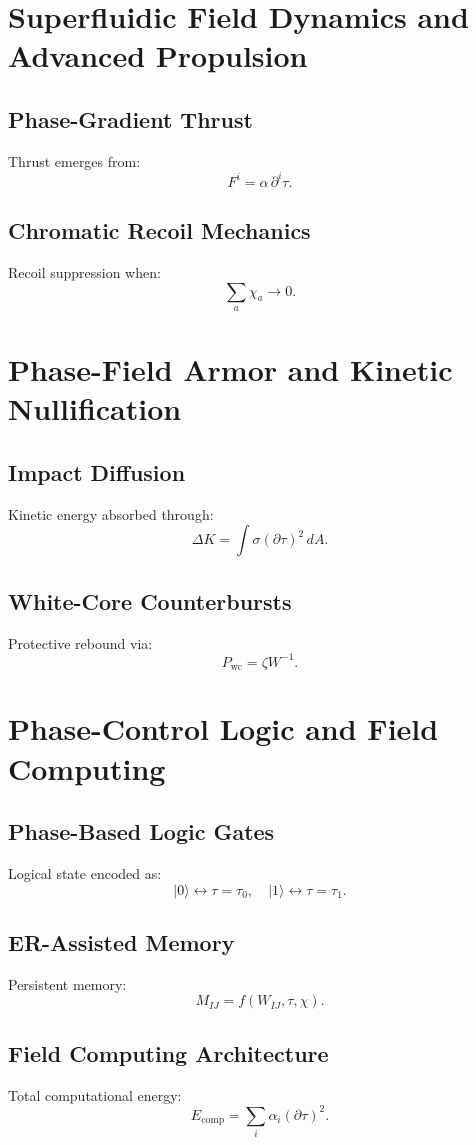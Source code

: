 \chapter{Superfluidic Field Dynamics and Advanced Propulsion}

\section{Phase-Gradient Thrust}
Thrust emerges from:
\[
F^i = \alpha\, \partial^i \tau.
\]

\section{Chromatic Recoil Mechanics}
Recoil suppression when:
\[
\sum_a \chi_a \to 0.
\]

\chapter{Phase-Field Armor and Kinetic Nullification}

\section{Impact Diffusion}
Kinetic energy absorbed through:
\[
\Delta K = \int \sigma(\partial\tau)^2\, dA.
\]

\section{White-Core Counterbursts}
Protective rebound via:
\[
P_{\mathrm{wc}} = \zeta W^{-1}.
\]

\chapter{Phase-Control Logic and Field Computing}

\section{Phase-Based Logic Gates}
Logical state encoded as:
\[
|0\rangle \leftrightarrow \tau=\tau_0,
\quad
|1\rangle \leftrightarrow \tau=\tau_1.
\]

\section{ER-Assisted Memory}
Persistent memory:
\[
M_{IJ} = f(W_{IJ},\tau,\chi).
\]

\section{Field Computing Architecture}
Total computational energy:
\[
E_{\mathrm{comp}} = \sum_i \alpha_i (\partial\tau)^2.
\]
